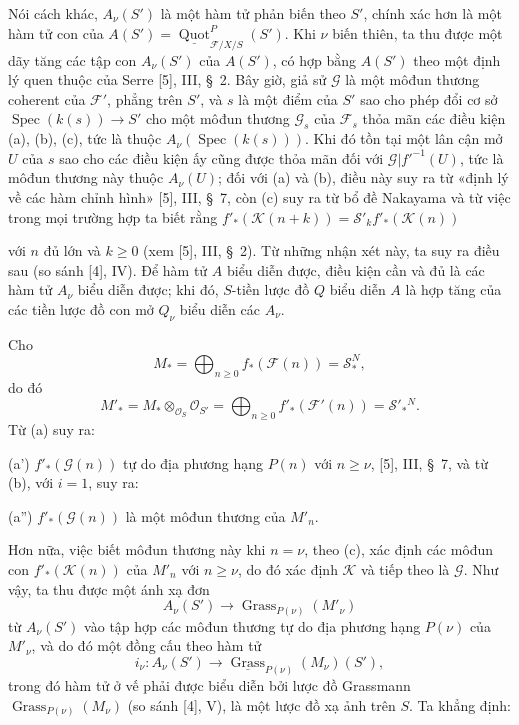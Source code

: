 \documentclass[11pt,twoside,openany]{book}
\numberwithin{equation}{section}
\newcommand{\src}[1]{%
  \phantomsection\hypertarget{src:\fgasourceid:#1}{}%
  \marginpar{\raggedleft\footnotesize\sffamily #1}%
}
\newcommand{\fgasourceid}{unset}
\begin{document}
Nói cách khác, $A_\nu(S')$ là một hàm tử phản biến theo $S'$, chính xác hơn là
một hàm tử con của
$A(S')=\underline{\operatorname{Quot}}^P_{\mathcal F/X/S}(S')$. Khi $\nu$
biến thiên, ta thu được một dãy tăng các tập con $A_\nu(S')$ của $A(S')$, có
hợp bằng $A(S')$ theo một định lý quen thuộc của Serre [5], III, \S~2. Bây giờ,
giả sử $\mathcal G$ là một môđun thương coherent của $\mathcal F'$, phẳng trên
$S'$, và $s$ là một điểm của $S'$ sao cho phép đổi cơ sở
$\operatorname{Spec}(k(s))\longrightarrow S'$ cho một môđun thương
$\mathcal G_s$ của $\mathcal F_s$ thỏa mãn các điều kiện (a), (b), (c), tức là
thuộc $A_\nu(\operatorname{Spec}(k(s)))$. Khi đó tồn tại một lân cận mở $U$
của $s$ sao cho các điều kiện ấy cũng được thỏa mãn đối với
$\mathcal G|f'^{-1}(U)$, tức là môđun thương này thuộc $A_\nu(U)$; đối với (a)
và (b), điều này suy ra từ «định lý về các hàm chỉnh hình» [5], III, \S~7, còn
(c) suy ra từ bổ đề Nakayama và từ việc trong mọi trường hợp ta biết rằng
$f'_*(\mathcal K(n+k))=\mathcal S'_k f'_*(\mathcal K(n))$
\src{261}
với $n$ đủ lớn và $k\geq0$ (xem [5], III, \S~2). Từ những nhận xét này, ta
suy ra điều sau (so sánh [4], IV). Để hàm tử $A$ biểu diễn được, điều kiện cần
và đủ là các hàm tử $A_\nu$ biểu diễn được; khi đó, $S$-tiền lược đồ $Q$ biểu
diễn $A$ là hợp tăng của các tiền lược đồ con mở $Q_\nu$ biểu diễn các
$A_\nu$.

Cho
\[
M_* =\bigoplus_{n\geq0}f_*(\mathcal F(n))=\mathcal S_*^{N},
\]
do đó
\[
M'_* =M_*\otimes_{\mathcal O_S}\mathcal O_{S'}
=\bigoplus_{n\geq0}f'_*(\mathcal F'(n))=\mathcal S'_*{}^{N}.
\]
Từ (a) suy ra:

\noindent (a') $f'_*(\mathcal G(n))$ tự do địa phương hạng $P(n)$ với
$n\geq\nu$, [5], III, \S~7, và từ (b), với $i=1$, suy ra:

\noindent (a'') $f'_*(\mathcal G(n))$ là một môđun thương của $M'_n$.

Hơn nữa, việc biết môđun thương này khi $n=\nu$, theo (c), xác định các môđun
con $f'_*(\mathcal K(n))$ của $M'_n$ với $n\geq\nu$, do đó xác định
$\mathcal K$ và tiếp theo là $\mathcal G$. Như vậy, ta thu được một ánh xạ đơn
\[
A_\nu(S')\longrightarrow\operatorname{Grass}_{P(\nu)}(M'_\nu)
\]
từ $A_\nu(S')$ vào tập hợp các môđun thương tự do địa phương hạng $P(\nu)$ của
$M'_\nu$, và do đó một đồng cấu theo hàm tử
\[
i_\nu:A_\nu(S')\longrightarrow
\underline{\operatorname{Grass}}_{P(\nu)}(M_\nu)(S'),
\]
trong đó hàm tử ở vế phải được biểu diễn bởi lược đồ Grassmann
$\operatorname{Grass}_{P(\nu)}(M_\nu)$ (so sánh [4], V), là một lược đồ xạ
ảnh trên $S$. Ta khẳng định:
\end{document}
